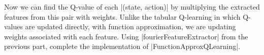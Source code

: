 \item {}

Now we can find the Q-value of each |(state, action)| by multiplying the extracted features from this pair with weights. 
Unlike the tabular Q-learning in which Q-values are updated directly, with function approximation, we are updating weights associated 
with each feature. Using |fourierFeatureExtractor| from the previous part, complete the implementation of |FunctionApproxQLearning|.
